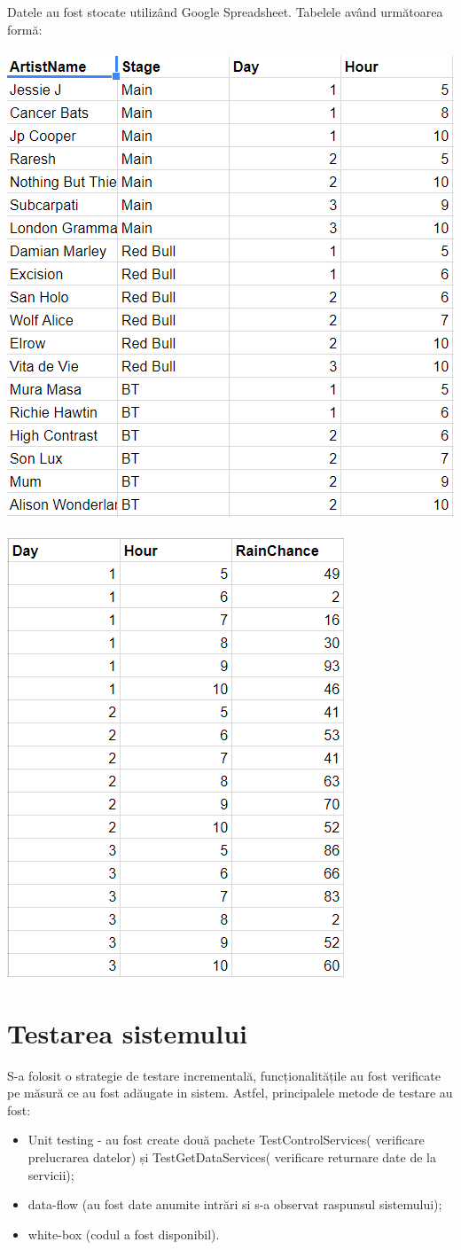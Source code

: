 \documentclass[11pt,a4paper,twoside,notitlepage]{article}
\begin{document}
Datele au fost stocate utiliz\^{a}nd Google Spreadsheet. Tabelele av\^and următoarea formă: \\ \\
\includegraphics[height=.4\textheight, width=.6\textwidth]{artisti} \\ \\
\includegraphics[height=.35\textheight, width=.5\textwidth]{vreme} \\



\section{Testarea sistemului}

S-a folosit o strategie de testare incrementală, funcționalitățile au fost verificate pe măsură ce au fost adăugate in sistem. Astfel, principalele metode de testare au fost:
\begin{itemize}
	\item Unit testing - au fost create două pachete TestControlServices( verificare prelucrarea datelor) și TestGetDataServices( verificare returnare date de la servicii);
	\item data-flow (au fost date anumite intrări si s-a observat raspunsul sistemului);
	\item white-box (codul a fost disponibil).
\end{itemize}
\end{document}
